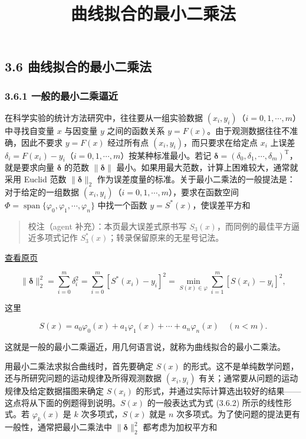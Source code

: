 \documentclass[
  10pt,
  fontset=fandol]{ctexart}
\title{曲线拟合的最小二乘法}
\author{}
\date{}
\begin{document}
\maketitle

\subsection{3.6 曲线拟合的最小二乘法}\label{ux66f2ux7ebfux62dfux5408ux7684ux6700ux5c0fux4e8cux4e58ux6cd5}

\subsubsection{3.6.1 一般的最小二乘逼近}\label{ux4e00ux822cux7684ux6700ux5c0fux4e8cux4e58ux903cux8fd1}

在科学实验的统计方法研究中，往往要从一组实验数据 \((x_i,y_i)\)（\(i=0,1,\cdots,m\)）中寻找自变量 \(x\) 与因变量 \(y\) 之间的函数关系 \(y=F(x)\)。由于观测数据往往不准确，因此不要求 \(y=F(x)\) 经过所有点 \((x_i,y_i)\)，而只要求在给定点 \(x_i\) 上误差 \(\delta_i=F(x_i)-y_i\)（\(i=0,1,\cdots,m\)）按某种标准最小。若记 \(\boldsymbol\delta=(\delta_0,\delta_1,\cdots,\delta_m)^{\mathrm T}\)，就是要求向量 \(\boldsymbol\delta\) 的范数 \(\|\boldsymbol\delta\|\) 最小。如果用最大范数，计算上困难较大，通常就采用 Euclid 范数 \(\|\boldsymbol\delta\|_2\) 作为误差度量的标准。关于最小二乘法的一般提法是：对于给定的一组数据 \((x_i,y_i)\)（\(i=0,1,\cdots,m\)），要求在函数空间 \(\Phi=\operatorname{span}\{\varphi_0,\varphi_1,\cdots,\varphi_n\}\) 中找一个函数 \(y=S^*(x)\)，使误差平方和

\begin{quote}
校注（agent 补充）：本页最大误差式原书写 \(S_3(x)\)，而同例的最佳平方逼近多项式记作 \(S_3^*(x)\)；转录保留原来的无星号记法。
\end{quote}

\href{../../source-images/pdf-079.jpeg}{查看原页}

\[
\|\boldsymbol\delta\|_2^2=\sum_{i=0}^m\delta_i^2=\sum_{i=0}^m[S^*(x_i)-y_i]^2=\min_{S(x)\in\varphi}\sum_{i=1}^m[S(x_i)-y_i]^2,\tag{3.6.1}
\]

这里

\[
S(x)=a_0\varphi_0(x)+a_1\varphi_1(x)+\cdots+a_n\varphi_n(x)\quad(n<m).\tag{3.6.2}
\]

这就是一般的最小二乘逼近，用几何语言说，就称为曲线拟合的最小二乘法。

用最小二乘法求拟合曲线时，首先要确定 \(S(x)\) 的形式。这不是单纯数学问题，还与所研究问题的运动规律及所得观测数据 \((x_i,y_i)\) 有关；通常要从问题的运动规律及给定数据描图来确定 \(S(x_i)\) 的形式，并通过实际计算选出较好的结果------这点将从下面的例题得到说明。\(S(x)\) 的一般表达式为式 (3.6.2) 所示的线性形式。若 \(\varphi_k(x)\) 是 \(k\) 次多项式，\(S(x)\) 就是 \(n\) 次多项式。为了使问题的提法更有一般性，通常把最小二乘法中 \(\|\boldsymbol\delta\|_2^2\) 都考虑为加权平方和
\end{document}
